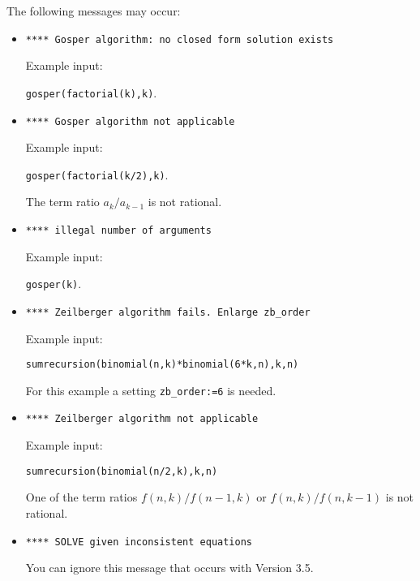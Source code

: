 The following messages may occur:
\begin{itemize}
\item
{\tt ***** Gosper algorithm:\ no closed form solution exists}

Example input:

{\tt gosper(factorial(k),k)}.
\item
{\tt ***** Gosper algorithm not applicable}

Example input:

{\tt gosper(factorial(k/2),k)}.

The term ratio $a_k/a_{k-1}$ is not rational.
\item
{\tt ***** illegal number of arguments}

Example input:

{\tt gosper(k)}.
\item
{\tt ***** Zeilberger algorithm fails.\ Enlarge zb\verb+_+order}

Example input:

{\tt sumrecursion(binomial(n,k)*binomial(6*k,n),k,n)}

For  this example a setting {\tt zb\verb+_+order:=6} is needed.
\item
{\tt ***** Zeilberger algorithm not applicable}

Example input:

{\tt sumrecursion(binomial(n/2,k),k,n)}

One of the term ratios $f(n,k)/f(n-1,k)$ or $f(n,k)/f(n,k-1)$
is not rational.
\item
{\tt ***** SOLVE given inconsistent equations}

You can ignore this message that occurs with Version 3.5.
\end{itemize}

